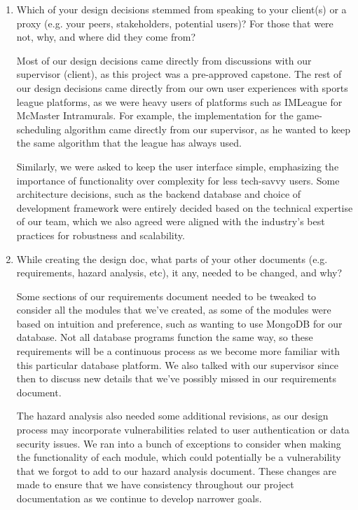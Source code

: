 \documentclass[12pt, titlepage]{article}
\begin{document}
\begin{enumerate}
  \item Which of your design decisions stemmed from speaking to your client(s)
        or a proxy (e.g. your peers, stakeholders, potential users)? For those that
        were not, why, and where did they come from?

  Most of our design decisions came directly from discussions with our supervisor (client), as this project was a pre-approved capstone. The rest of our design decisions came directly from our own user experiences with sports league platforms, as we were heavy users of platforms such as IMLeague for McMaster Intramurals. For example, the implementation for the game-scheduling algorithm came directly from our supervisor, as he wanted to keep the same algorithm that the league has always used. 

  Similarly, we were asked to keep the user interface simple, emphasizing the importance of functionality over complexity for less tech-savvy users. Some architecture decisions, such as the backend database and choice of development framework were entirely decided based on the technical expertise of our team, which we also agreed were aligned with the industry’s best practices for robustness and scalability.

  \item While creating the design doc, what parts of your other documents (e.g.
        requirements, hazard analysis, etc), it any, needed to be changed, and why?

  Some sections of our requirements document needed to be tweaked to consider all the modules that we’ve created, as some of the modules were based on intuition and preference, such as wanting to use MongoDB for our database. Not all database programs function the same way, so these requirements will be a continuous process as we become more familiar with this particular database platform. We also talked with our supervisor since then to discuss new details that we’ve possibly missed in our requirements document. 

  The hazard analysis also needed some additional revisions, as our design process may incorporate vulnerabilities related to user authentication or data security issues. We ran into a bunch of exceptions to consider when making the functionality of each module, which could potentially be a vulnerability that we forgot to add to our hazard analysis document. These changes are made to ensure that we have consistency throughout our project documentation as we continue to develop narrower goals.


\end{enumerate}
\end{document}
